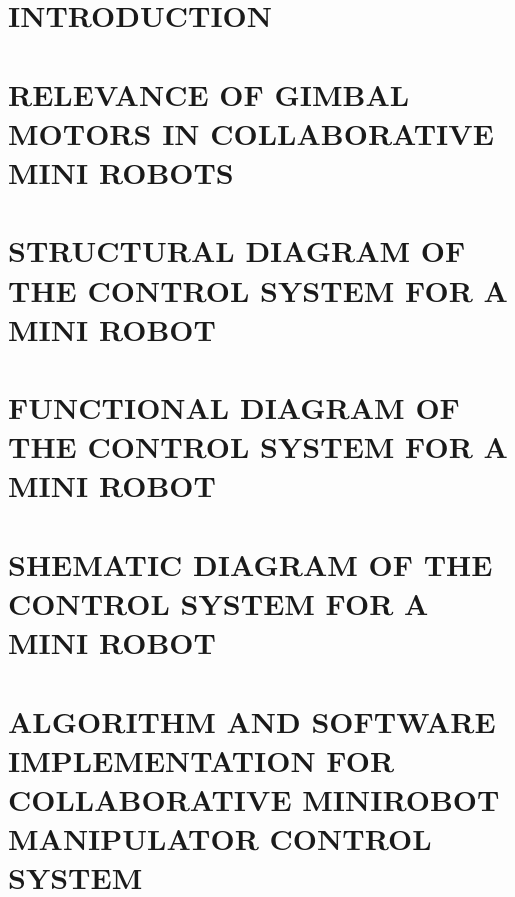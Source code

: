 
\section*{INTRODUCTION}


\section{RELEVANCE OF GIMBAL MOTORS IN COLLABORATIVE MINI ROBOTS}


\section{STRUCTURAL DIAGRAM OF THE CONTROL SYSTEM FOR A MINI ROBOT}


\section{FUNCTIONAL DIAGRAM OF THE CONTROL SYSTEM FOR A MINI ROBOT}


\section{SHEMATIC DIAGRAM OF THE CONTROL SYSTEM FOR A MINI ROBOT}

\section{ALGORITHM AND SOFTWARE IMPLEMENTATION FOR COLLABORATIVE MINIROBOT MANIPULATOR CONTROL SYSTEM}








% 
